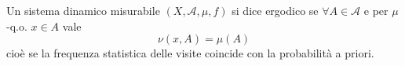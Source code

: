 \begin{definition}
    Un sistema dinamico misurabile $ (X, \mathcal{A}, \mu, f) $ si dice ergodico se $ \forall A \in \mathcal{A} $ e per $ \mu $-q.o. $ x \in A $ vale
    \[
        \nu(x, A) = \mu(A)
    \]
    cioè se la frequenza statistica delle visite coincide con la probabilità a priori. 
\end{definition}
